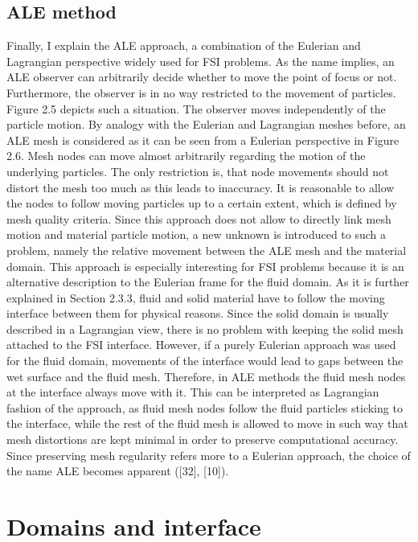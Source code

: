 \subsection{ALE method}
\label{subsec:ALE}

Finally, I explain the ALE approach, a combination of the Eulerian and Lagrangian perspective widely
used for FSI problems. As the name implies, an ALE observer can arbitrarily decide whether to move
the point of focus or not. Furthermore, the observer is in no way restricted to the movement of particles.
Figure 2.5 depicts such a situation. The observer moves independently of the particle motion.
By analogy with the Eulerian and Lagrangian meshes before, an ALE mesh is considered as it can be seen
from a Eulerian perspective in Figure 2.6. Mesh nodes can move almost arbitrarily regarding the motion
of the underlying particles. The only restriction is, that node movements should not distort the mesh too
much as this leads to inaccuracy. It is reasonable to allow the nodes to follow moving particles up to a
certain extent, which is defined by mesh quality criteria. Since this approach does not allow to directly link mesh motion and material particle motion, a new unknown is introduced to such a problem, namely
the relative movement between the ALE mesh and the material domain. This approach is especially
interesting for FSI problems because it is an alternative description to the Eulerian frame for the fluid
domain. As it is further explained in Section 2.3.3, fluid and solid material have to follow the moving
interface between them for physical reasons. Since the solid domain is usually described in a Lagrangian
view, there is no problem with keeping the solid mesh attached to the FSI interface. However, if a purely
Eulerian approach was used for the fluid domain, movements of the interface would lead to gaps between
the wet surface and the fluid mesh. Therefore, in ALE methods the fluid mesh nodes at the interface
always move with it. This can be interpreted as Lagrangian fashion of the approach, as fluid mesh nodes
follow the fluid particles sticking to the interface, while the rest of the fluid mesh is allowed to move
in such way that mesh distortions are kept minimal in order to preserve computational accuracy. Since
preserving mesh regularity refers more to a Eulerian approach, the choice of the name ALE becomes
apparent ([32], [10]).


\section{Domains and interface}

